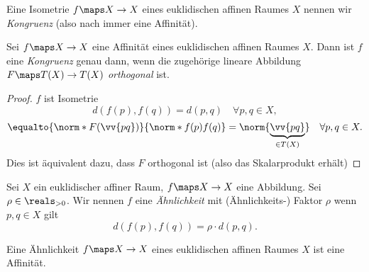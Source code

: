 \begin{definition*}
  Eine Isometrie \( f\maps X\to X \) eines euklidischen affinen Raumes \( X \) nennen wir \emph{Kongruenz} (also nach  immer eine Affinität).
\end{definition*}
\begin{lemma}
  Sei \( f\maps X\to X \) eine Affinität eines euklidischen affinen Raumes \( X \). Dann ist \( f \) eine \emph{Kongruenz} genau dann, wenn die zugehörige lineare Abbildung \( F\maps T(X)\to T(X) \) \emph{orthogonal} ist.
\end{lemma}
\begin{proof}
  \( f  \) ist Isometrie \gdw
  \begin{equation*}
    d(f(p),f(q))=d(p,q)\quad \forall p,q\in X,
  \end{equation*}
  \dh \gdw
  \begin{equation*}
    \equalto{\norm*{F(\vv{pq})}}{\norm*{f(p)f(q)}}=\norm{\underbrace{\vv{pq}}_{\in T(X)}} \quad \forall p,q\in X.
  \end{equation*}
  Dies ist äquivalent dazu, dass \( F \) orthogonal ist (also das Skalarprodukt erhält)
\end{proof}
\begin{definition*}
  Sei \( X \) ein euklidischer affiner Raum, \( f\maps X\to X \) eine Abbildung. Sei \( \rho\in \reals_{>0} \). Wir nennen \( f  \) eine \emph{Ähnlichkeit} mit (Ähnlichkeits-) Faktor \( \rho \) wenn \tforall  \( p,q\in X \) gilt
  \begin{equation*}
    d(f(p),f(q))=\rho\cdot d(p,q).
  \end{equation*}
\end{definition*}
\begin{korollar*}
  Eine Ähnlichkeit \( f\maps X\to X \) eines euklidischen affinen Raumes \( X \) ist eine Affinität.
\end{korollar*}
